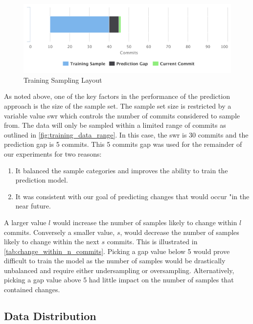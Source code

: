 \begin{figure}[!ht]
    \centering
        \includegraphics[width=1.0\textwidth]{images/training_sampling}
    \caption{Training Sampling Layout}
    \label{fig:training_data_range}
\end{figure}

As noted above, one of the key factors in the performance of the prediction approach is the size of the sample set. The sample set size is restricted by a variable value \gls{swr} which controls the number of commits considered to sample from. The data will only be sampled within a limited range of commits as outlined in \autoref{fig:training_data_range}. In this case, the \gls{swr} is 30 commits and the prediction gap is 5 commits. This 5 commits gap was used for the remainder of our experiments for two reasons:
\begin{enumerate}
\item It balanced the sample categories and improves the ability to train the prediction model.
\item It was consistent with our goal of predicting changes that would occur "in the near future.
\end{enumerate}
A larger value $l$ would increase the number of samples likely to change within $l$ commits. Conversely a smaller value, $s$, would decrease the number of samples likely to change within the next $s$ commits. This is illustrated in \autoref{tab:change_within_n_commits}. Picking a gap value below 5 would prove difficult to train the model as the number of samples would be drastically unbalanced and require either undersampling or oversampling. Alternatively, picking a gap value above 5 had little impact on the number of samples that contained changes.



\subsection{Data Distribution}
\label{subsec:data_distribution}

